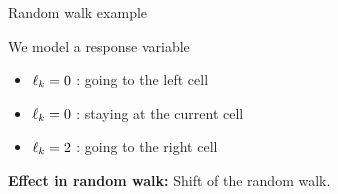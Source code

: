 \documentclass{beamer}
\begin{document}
        \begin{frame}{Random walk example}

        We model a response variable
        \begin{itemize}
            \item $\ell_{k}=0$ : going to the left cell
            \item $\ell_{k}=0$ : staying at the current cell
            \item $\ell_{k}=2$ : going to the right cell
        \end{itemize}


        {\bf Effect in random walk:} Shift of the random walk.
    \end{frame}
\end{document}
